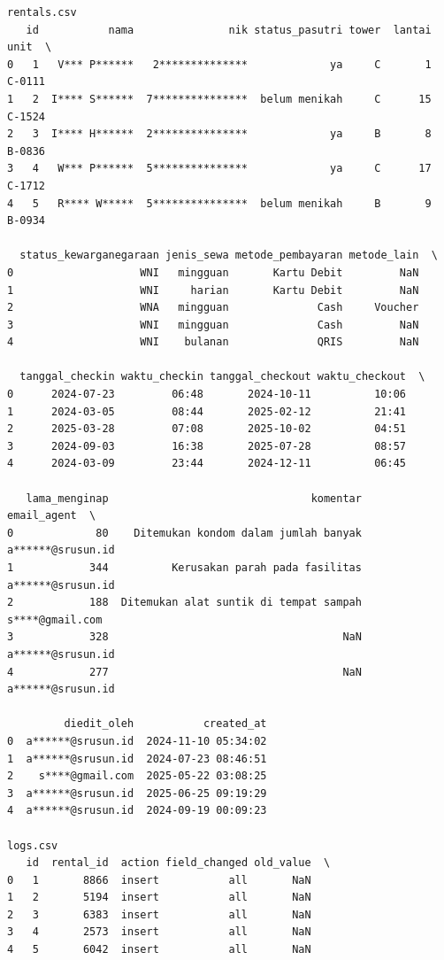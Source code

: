 \begin{lstlisting}[caption={Output 1}]
rentals.csv
   id           nama               nik status_pasutri tower  lantai    unit  \
0   1   V*** P******   2**************             ya     C       1  C-0111   
1   2  I**** S******  7***************  belum menikah     C      15  C-1524   
2   3  I**** H******  2***************             ya     B       8  B-0836   
3   4   W*** P******  5***************             ya     C      17  C-1712   
4   5   R**** W*****  5***************  belum menikah     B       9  B-0934   

  status_kewarganegaraan jenis_sewa metode_pembayaran metode_lain  \
0                    WNI   mingguan       Kartu Debit         NaN   
1                    WNI     harian       Kartu Debit         NaN   
2                    WNA   mingguan              Cash     Voucher   
3                    WNI   mingguan              Cash         NaN   
4                    WNI    bulanan              QRIS         NaN   

  tanggal_checkin waktu_checkin tanggal_checkout waktu_checkout  \
0      2024-07-23         06:48       2024-10-11          10:06   
1      2024-03-05         08:44       2025-02-12          21:41   
2      2025-03-28         07:08       2025-10-02          04:51   
3      2024-09-03         16:38       2025-07-28          08:57   
4      2024-03-09         23:44       2024-12-11          06:45   

   lama_menginap                                komentar        email_agent  \
0             80    Ditemukan kondom dalam jumlah banyak  a******@srusun.id   
1            344          Kerusakan parah pada fasilitas  a******@srusun.id   
2            188  Ditemukan alat suntik di tempat sampah    s****@gmail.com   
3            328                                     NaN  a******@srusun.id   
4            277                                     NaN  a******@srusun.id   

         diedit_oleh           created_at  
0  a******@srusun.id  2024-11-10 05:34:02  
1  a******@srusun.id  2024-07-23 08:46:51  
2    s****@gmail.com  2025-05-22 03:08:25  
3  a******@srusun.id  2025-06-25 09:19:29  
4  a******@srusun.id  2024-09-19 00:09:23  

logs.csv
   id  rental_id  action field_changed old_value  \
0   1       8866  insert           all       NaN   
1   2       5194  insert           all       NaN   
2   3       6383  insert           all       NaN   
3   4       2573  insert           all       NaN   
4   5       6042  insert           all       NaN   


\end{lstlisting}
